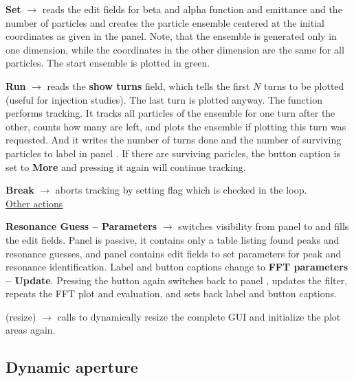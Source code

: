 \documentclass[12pt]{article}
\newcommand\code[1]{{\tt #1}}
\newcommand{\ofld}[1]{\colorbox{black!15}{{{\color{black}\bf #1}}}}
\newcommand{\ofldx}[1]{\colorbox{black!15}{{\color{black}(#1)}}}
\newcommand\guico[1]{{\color{blue}\code{#1}}}
\newcommand{\evcod}[2]{\ofld{#1} $\rightarrow$ \guico{#2}}
\newcommand{\evcodx}[2]{\ofldx{#1} $\rightarrow$ \guico{#2}}
\newcommand{\opagui}[1]{\colorbox{blue!20}{{\color{black}\code{#1}}}}
\newcommand{\oguih}[2]{\subsection{\label{#2}#1}{\Huge\opagui{#2}}\\}
\begin{document}
\evcod{Set}{ButBeamShowClick} reads the edit fields for beta and alpha function and emittance and the number of particles and creates the particle ensemble centered at the initial coordinates as given in the \guico{PanCtrl} panel. Note, that the ensemble is generated only in one dimension, while the coordinates in the other dimension are the same for all particles. The start ensemble is plotted in green.

\evcod{Run}{ButBeamRunClick} reads the \ofld{show turns} field, which tells the first $N$ turns to be plotted (useful for injection studies). The last turn is plotted anyway. The function \guico{TrackBeam} performs tracking. It tracks all particles of the ensemble for one turn after the other, counts how many are left, and plots the ensemble if plotting this turn was requested. And it writes the number of turns done and the number of surviving particles to label \guico{LabT} in panel \guico{PanParam}. If there are surviving paricles, the button caption is set to \ofld{More} and pressing it again will continue tracking.

\evcod{Break}{ButBeamBreak} aborts tracking by setting flag \guico{BeamBreak} which is checked in the \guico{TrackBeam} loop.\\[1ex]

\underline{Other actions}

\evcod{Resonance Guess -- Parameters}{butParamClick} switches visibility from panel \guico{PanRes} to \guico{PanFFT} and fills the edit fields. Panel \guico{PanRes} is passive, it contains only a table listing found peaks and resonance guesses, and panel \guico{PanFFT} contains edit fields to set parameters for peak and resonance identification. Label and button captions change to \ofld{FFT parameters -- Update}. Pressing the button again switches back to panel \guico{PanRes}, updates the filter, repeats the FFT plot and evaluation, and sets back label and button captions.

\evcodx{resize}{FormResize} calls \guico{ResizeAll} to dynamically resize the complete GUI and initialize the plot areas again.


\oguih{Dynamic aperture}{opatrackda} 
\end{document}
